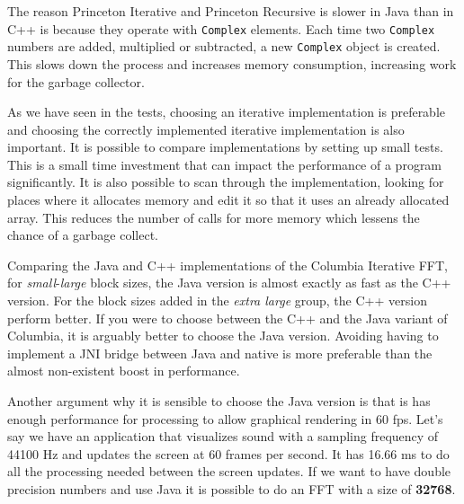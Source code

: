 The reason Princeton Iterative and Princeton Recursive is slower in Java than in C++ is because they operate with \texttt{Complex} elements. Each time two \texttt{Complex} numbers are added, multiplied or subtracted, a new \texttt{Complex} object is created. This slows down the process and increases memory consumption, increasing work for the garbage collector.

As we have seen in the tests, choosing an iterative implementation is preferable and choosing the correctly implemented iterative implementation is also important. It is possible to compare implementations by setting up small tests. This is a small time investment that can impact the performance of a program significantly. It is also possible to scan through the implementation, looking for places where it allocates memory and edit it so that it uses an already allocated array. This reduces the number of calls for more memory which lessens the chance of a garbage collect.



Comparing the Java and C++ implementations of the Columbia Iterative FFT, for \emph{small}-\emph{large} block sizes, the Java version is almost exactly as fast as the C++ version. For the block sizes added in the \emph{extra large} group, the C++ version perform better. If you were to choose between the C++ and the Java variant of Columbia, it is arguably better to choose the Java version. Avoiding having to implement a JNI bridge between Java and native is more preferable than the almost non-existent boost in performance.

Another argument why it is sensible to choose the Java version is that is has enough performance for processing to allow graphical rendering in 60 \gls{fps}. Let's say we have an application that visualizes sound with a sampling frequency of 44100 Hz and updates the screen at 60 frames per second. It has 16.66 ms to do all the processing needed between the screen updates. If we want to have double precision numbers and use Java it is possible to do an FFT with a size of \textbf{32768}.

